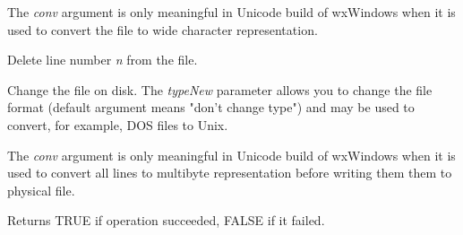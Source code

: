 The {\it conv} argument is only meaningful in Unicode build of wxWindows when
it is used to convert the file to wide character representation.

\label{wxtextfileremoveline}


Delete line number {\it n} from the file.

\label{wxtextfilewrite}


Change the file on disk. The {\it typeNew} parameter allows you to change the
file format (default argument means "don't change type") and may be used to
convert, for example, DOS files to Unix.

The {\it conv} argument is only meaningful in Unicode build of wxWindows when
it is used to convert all lines to multibyte representation before writing them
them to physical file.

Returns TRUE if operation succeeded, FALSE if it failed.

